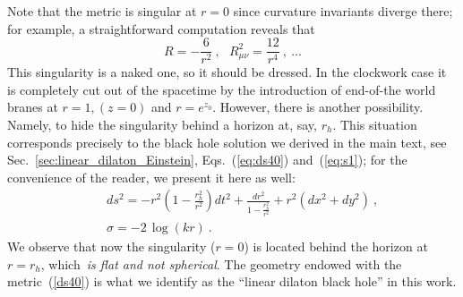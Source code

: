 \documentclass[a4paper, 12pt]{article}
\def\be{\begin{equation}}
\def\ee{\end{equation}}
\def\bea{\begin{eqnarray}}
\def\eea{\end{eqnarray}}
\begin{document}
Note that the metric is singular at $r=0$ since curvature invariants diverge there; for example, a straightforward computation reveals that
\be
R= -\frac{6}{r^2} \ ,~~~  R_{\mu\nu}^2=\frac{12}{r^4} \ ,~\ldots
\ee
This singularity is a naked one, so it should be dressed. In the clockwork case 
it is completely cut out of the spacetime by the introduction of end-of-the world branes at $r=1, (z=0)$ and $r=e^{z_0}$.   
However, there is another  possibility. Namely, to hide the singularity behind a horizon at, say,  $r_h$. This situation corresponds precisely to the black hole solution we derived in the main text, see Sec.~\ref{sec:linear_dilaton_Einstein}, Eqs.~(\ref{eq:ds40}) and~(\ref{eq:s1}); for the convenience of the reader, we present it here as well:
\bea
&&d s^2=-r^2\left(1-\frac{r_h^2}{r^2}\right)d t^2+\frac{d r^2}{1-\frac{r_h^2}{r^2}}+r^2\left(
d x^2+d y^2\right) \ ,\label{ds40}\\
&&\sigma=-2\, \log (k r)\ .  
\eea
We observe that now the singularity ($r=0$) is located behind the horizon at $r=r_h$, which~\emph{is flat and not spherical}. 
The geometry endowed with the metric~(\ref{ds40}) is what we identify as the ``linear dilaton black hole'' in this work.   




\end{document}
